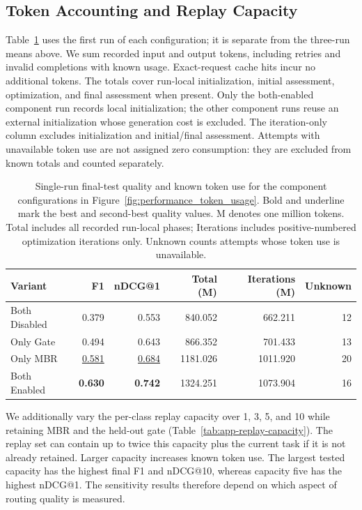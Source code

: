 \subsection{Token Accounting and Replay Capacity}
Table~\ref{tab:app-ablation-tokens} uses the first run of each configuration; it is separate from the three-run means above. We sum recorded input and output tokens, including retries and invalid completions with known usage. Exact-request cache hits incur no additional tokens. The totals cover run-local initialization, initial assessment, optimization, and final assessment when present. Only the both-enabled component run records local initialization; the other component runs reuse an external initialization whose generation cost is excluded. The iteration-only column excludes initialization and initial/final assessment. Attempts with unavailable token use are not assigned zero consumption: they are excluded from known totals and counted separately.

\begin{table}[t]
\centering
\small
\begin{tabular}{lrrrrr}
\toprule
Variant & F1 & nDCG@1 & Total (M) & Iterations (M) & Unknown \\
\midrule
Both Disabled & 0.379 & 0.553 & 840.052 & 662.211 & 12 \\
Only Gate & 0.494 & 0.643 & 866.352 & 701.433 & 13 \\
Only MBR & \underline{0.581} & \underline{0.684} & 1181.026 & 1011.920 & 20 \\
Both Enabled & \textbf{0.630} & \textbf{0.742} & 1324.251 & 1073.904 & 16 \\
\bottomrule
\end{tabular}
\caption{Single-run final-test quality and known token use for the component configurations in Figure~\ref{fig:performance_token_usage}. Bold and underline mark the best and second-best quality values. M denotes one million tokens. Total includes all recorded run-local phases; Iterations includes positive-numbered optimization iterations only. Unknown counts attempts whose token use is unavailable.}
\label{tab:app-ablation-tokens}
\end{table}

We additionally vary the per-class replay capacity over 1, 3, 5, and 10 while retaining MBR and the held-out gate (Table~\ref{tab:app-replay-capacity}). The replay set can contain up to twice this capacity plus the current task if it is not already retained. Larger capacity increases known token use. The largest tested capacity has the highest final F1 and nDCG@10, whereas capacity five has the highest nDCG@1. The sensitivity results therefore depend on which aspect of routing quality is measured.

